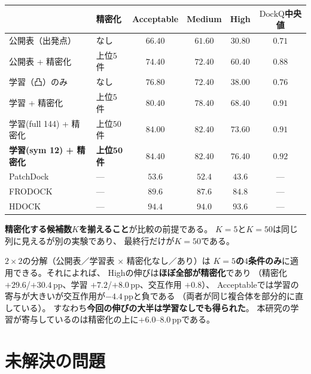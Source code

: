 \documentclass[11pt,a4paper]{article}
\newcommand{\dockq}{\mathrm{DockQ}}
\begin{document}
\begin{center}
\begin{tabular}{llcccc}
\toprule
 & 精密化 & Acceptable & Medium & High & $\dockq$中央値\\
\midrule
公開表（出発点） & なし        & $66.40$ & $61.60$ & $30.80$ & $0.71$\\
公開表 + 精密化   & 上位$5$件   & $74.40$ & $72.40$ & $60.40$ & $0.88$\\
学習（凸）のみ    & なし        & $76.80$ & $72.40$ & $38.00$ & $0.76$\\
学習 + 精密化     & 上位$5$件   & $80.40$ & $78.40$ & $68.40$ & $0.91$\\
学習(full 144) + 精密化 & 上位$50$件 & $84.00$ & $82.40$ & $73.60$ & $0.91$\\
\textbf{学習(sym 12) + 精密化} & \textbf{上位$\mathbf{50}$件}
                  & $\mathbf{84.40}$ & $\mathbf{82.40}$ & $\mathbf{76.40}$ & $\mathbf{0.92}$\\
\midrule
PatchDock & --- & $53.6$ & $52.4$ & $43.6$ & ---\\
FRODOCK   & --- & $89.6$ & $87.6$ & $84.8$ & ---\\
HDOCK     & --- & $94.4$ & $94.0$ & $93.6$ & ---\\
\bottomrule
\end{tabular}
\end{center}

\textbf{精密化する候補数$K$を揃えること}が比較の前提である。
$K = 5$と$K = 50$は同じ列に見えるが別の実験であり、
最終行だけが$K = 50$である。

$2\times2$の分解（公開表／学習表 $\times$ 精密化なし／あり）は
\textbf{$K = 5$の$4$条件のみ}に適用できる。それによれば、
Highの伸びは\textbf{ほぼ全部が精密化}であり
（精密化 $+29.6$/$+30.4$\,pp、学習 $+7.2$/$+8.0$\,pp、交互作用 $+0.8$）、
Acceptableでは学習の寄与が大きいが交互作用が$-4.4$\,ppと負である
（両者が同じ複合体を部分的に直している）。
すなわち\textbf{今回の伸びの大半は学習なしでも得られた}。
本研究の学習が寄与しているのは精密化の上に$+6.0$--$8.0$\,ppである。

\section{未解決の問題}
\end{document}
